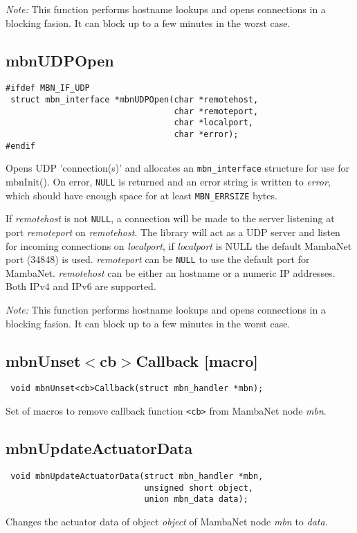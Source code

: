 \emph{Note:} This function performs hostname lookups and opens connections in a blocking fasion. It can block up to a few minutes in the worst case.


\subsection{mbnUDPOpen}
\begin{verbatim}
#ifdef MBN_IF_UDP
 struct mbn_interface *mbnUDPOpen(char *remotehost,
                                  char *remoteport,
                                  char *localport,
                                  char *error);
#endif
\end{verbatim}
Opens UDP 'connection(s)' and allocates an \verb|mbn_interface| structure for use for mbnInit(). On error, \verb|NULL| is returned and an error string is written to \textit{error}, which should have enough space for at least \verb|MBN_ERRSIZE| bytes.

If \textit{remotehost} is not \verb|NULL|, a connection will be made to the server listening at port \textit{remoteport} on \textit{remotehost}.
The library will act as a UDP server and listen for incoming connections on \textit{localport}, if \textit{localport} is NULL the default MambaNet port (34848) is used. \textit{remoteport} can be \verb|NULL| to use the default port for MambaNet. \textit{remotehost} can be either an hostname or a numeric IP addresses. Both IPv4 and IPv6 are supported.

\emph{Note:} This function performs hostname lookups and opens connections in a blocking fasion. It can block up to a few minutes in the worst case.


\subsection{mbnUnset$<$cb$>$Callback \footnotesize{[macro]}}
\begin{verbatim}
 void mbnUnset<cb>Callback(struct mbn_handler *mbn);
\end{verbatim}
Set of macros to remove callback function \verb|<cb>| from MambaNet node \textit{mbn}. 


\subsection{mbnUpdateActuatorData}
\begin{verbatim}
 void mbnUpdateActuatorData(struct mbn_handler *mbn,
                            unsigned short object,
                            union mbn_data data);
\end{verbatim}
Changes the actuator data of object \textit{object} of MambaNet node \textit{mbn} to \textit{data}.


